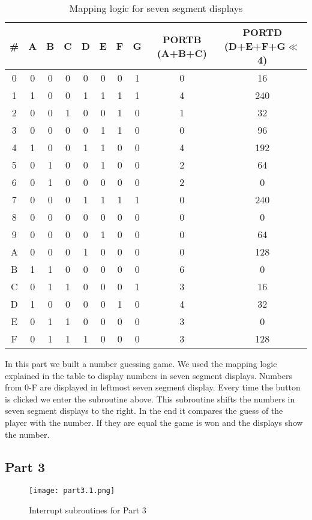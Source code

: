 \documentclass[pdftex,12pt,a4paper]{article}
\begin{document}
\begin{table}[H]
\centering
\small
\begin{tabular}{|c|c|c|c|c|c|c|c|c|c|}
\hline
\# & A & B & C & D & E & F & G & PORTB (A+B+C) & PORTD (D+E+F+G$\ll$4)\\
\hline
0 & 0 & 0 & 0 & 0 & 0 & 0 & 1 & 0 & 16\\
\hline
1 & 1 & 0 & 0 & 1 & 1 & 1 & 1 & 4 & 240\\
\hline
2 & 0 & 0 & 1 & 0 & 0 & 1 & 0 & 1 & 32\\
\hline
3 & 0 & 0 & 0 & 0 & 1 & 1 & 0 & 0 & 96\\
\hline
4 & 1 & 0 & 0 & 1 & 1 & 0 & 0 & 4 & 192\\
\hline
5 & 0 & 1 & 0 & 0 & 1 & 0 & 0 & 2 & 64\\
\hline
6 & 0 & 1 & 0 & 0 & 0 & 0 & 0 & 2 & 0\\
\hline
7 & 0 & 0 & 0 & 1 & 1 & 1 & 1 & 0 & 240\\
\hline
8 & 0 & 0 & 0 & 0 & 0 & 0 & 0 & 0 & 0\\
\hline
9 & 0 & 0 & 0 & 0 & 1 & 0 & 0 & 0 & 64\\
\hline
A & 0 & 0 & 0 & 1 & 0 & 0 & 0 & 0 & 128\\
\hline
B & 1 & 1 & 0 & 0 & 0 & 0 & 0 & 6 & 0\\
\hline
C & 0 & 1 & 1 & 0 & 0 & 0 & 1 & 3 & 16\\
\hline
D & 1 & 0 & 0 & 0 & 0 & 1 & 0 & 4 & 32\\
\hline
E & 0 & 1 & 1 & 0 & 0 & 0 & 0 & 3 & 0\\
\hline
F & 0 & 1 & 1 & 1 & 0 & 0 & 0 & 3 & 128\\
\hline
\end{tabular}
\caption{Mapping logic for seven segment displays}
\end{table}

In this part we built a number guessing game. We used the mapping logic explained in the table to display numbers in seven segment displays. Numbers from 0-F are displayed in leftmost seven segment display. Every time the button is clicked we enter the subroutine above. This subroutine shifts the numbers in seven segment displays to the right. In the end it compares the guess of the player with the number. If they are equal the game is won and the displays show the number.

\subsection{Part 3}
\begin{figure}[ht]
	\centering
	\texttt{[image: part3.1.png]}	
	\caption{Interrupt subroutines for Part 3}
	\label{fig4}
\end{figure}
\end{document}
